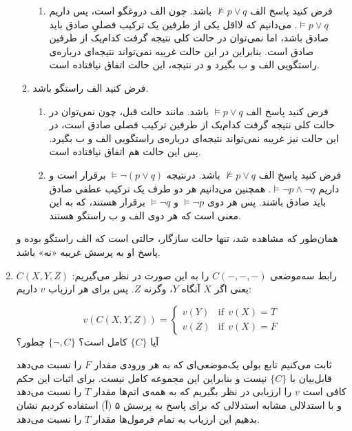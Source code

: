 \documentclass[12pt, 14paper]{article}
\begin{document}
\begin{enumerate}
\begin{ans}
\begin{enumerate}
\begin{enumerate}
      \item فرض کنید پاسخ الف $\not \vDash p \vee q$
      باشد. چون الف دروغگو است، پس داریم
      $\vDash p \vee q$.
      می‌دانیم که لااقل یکی از طرفین یک ترکیب فصلیِ صادق باید صادق باشد، اما نمی‌توان در حالت کلی نتیجه گرفت کدام‌یک از طرفین صادق است. بنابراین در این حالت غریبه نمی‌تواند نتیجه‌ای درباره‌ی راستگویی الف و ب بگیرد و در نتیجه، این حالت اتفاق نیافتاده است.
    \end{enumerate}
    \item فرض کنید الف راستگو باشد.
    \begin{enumerate}
      \item فرض کنید پاسخ الف $\vDash p \vee q$
      باشد. مانند حالت قبل، چون نمی‌توان در حالت کلی نتیجه گرفت کدام‌یک از طرفین ترکیب فصلی صادق است، در این حالت نیز غریبه نمی‌تواند نتیجه‌ای درباره‌ی راستگویی الف و ب بگیرد. پس این حالت هم اتفاق نیافتاده است.

      \item فرض کنید پاسخ الف $\not \vDash p \vee q$
      باشد. درنتیجه
      $\vDash \neg (p \vee q)$
      برقرار است و داریم
      $\vDash \neg p \wedge \neg q$.
      همچنین می‌دانیم هر دو طرف یک ترکیب عطفی صادق باید صادق باشند. پس هر دوی
      $\vDash \neg p$
      و
      $\vDash \neg q$
      برقرار هستند، که به این معنی است که هر دوی الف و ب راستگو هستند.
    \end{enumerate}
  \end{enumerate}
  همان‌طور که مشاهده شد، تنها حالت سازگار، حالتی است که الف راستگو بوده و پاسخ او به پرسش غریبه «نه» باشد.
\end{ans}

\item
رابط سه‌موضعی $C(-,-,-)$ را به این صورت در نظر می‌گیریم: $C(X,Y,Z)$ یعنی اگر $X$ آنگاه $Y$، وگرنه $Z$. پس برای هر ارزیاب $v$ داریم:

$$
v(C(X,Y,Z))=
\begin{cases}
v(Y) & \text{if}~~v(X)=T\\
v(Z) & \text{if}~~v(X)=F
\end{cases}
$$
آیا $\{C\}$ کامل است؟ $\{\neg, C\}$ چطور؟
\begin{ans}
  ثابت می‌کنیم تابع بولی یک‌موضعی‌ای که به هر ورودی مقدار $F$ را نسبت می‌دهد قابل‌بیان با $\{C\}$ نیست و بنابراین این مجموعه کامل نیست. برای اثبات این حکم کافی است $v$ را ارزیابی در نظر بگیریم که به همه‌ی اتم‌ها مقدار $T$ را نسبت می‌دهد و با استدلالی مشابه استدلالی که برای پاسخ به پرسش ۵ (آ) استفاده کردیم نشان بدهیم این ارزیاب به تمام فرمول‌ها مقدار $T$ را نسبت می‌دهد.


\end{ans}
\end{enumerate}
\end{document}
